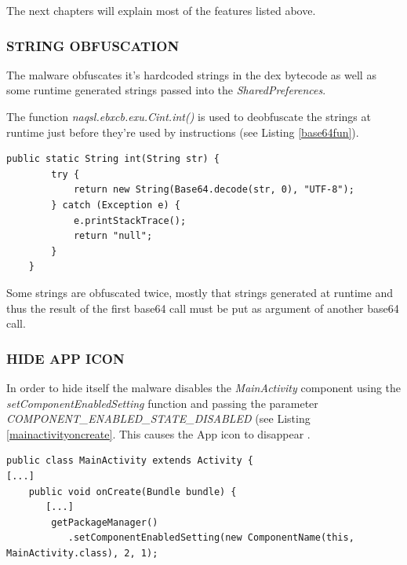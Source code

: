 \documentclass[10pt,titlepage]{article}
\begin{document}
The next chapters will explain most of the features listed above.



\newpage
\subsubsection{STRING OBFUSCATION} \label{stringobf}

The malware obfuscates it's hardcoded strings in the dex bytecode as well as some runtime generated strings passed into the \textit{SharedPreferences}.

The function \textit{naqsl.ebxcb.exu.Cint.int()} is used to deobfuscate the strings at runtime just before they're used by instructions (see Listing \ref{base64fun}).

\begin{lstlisting}[label=base64fun,caption=The function \textit{naqsl.ebxcb.exu.Cint.int()} deobfuscates the given string using the \textit{android.util.Base64.decode()} function.,frame=tb]
    public static String int(String str) {
        try {
            return new String(Base64.decode(str, 0), "UTF-8");
        } catch (Exception e) {
            e.printStackTrace();
            return "null";
        }
    }
\end{lstlisting}


Some strings are obfuscated twice, mostly that strings generated at runtime and thus the result of the first base64 call must be put as argument of another base64 call.



\subsubsection{HIDE APP ICON} \label{hideapp}
In order to hide itself the malware disables the \textit{MainActivity} component using the \textit{setComponentEnabledSetting} function and passing the parameter \textit{COMPONENT\_ENABLED\_STATE\_DISABLED} (see Listing \ref{mainactivityoncreate}. This causes the App icon to disappear \cite[reference/android/content/pm/PackageManager]{AndroidDev}.

\begin{lstlisting}[label=mainactivityoncreate,caption=\textit{MainActivity.onCreate} calls \textit{setComponentEnabledSetting} with \textit{COMPONENT\_ENABLED\_STATE\_DISABLED} parameter in order to let the App icon disappear in the launcher.,frame=tb]
public class MainActivity extends Activity {
[...]
    public void onCreate(Bundle bundle) {
       [...]
        getPackageManager()
           .setComponentEnabledSetting(new ComponentName(this, MainActivity.class), 2, 1);
\end{lstlisting}
\end{document}
